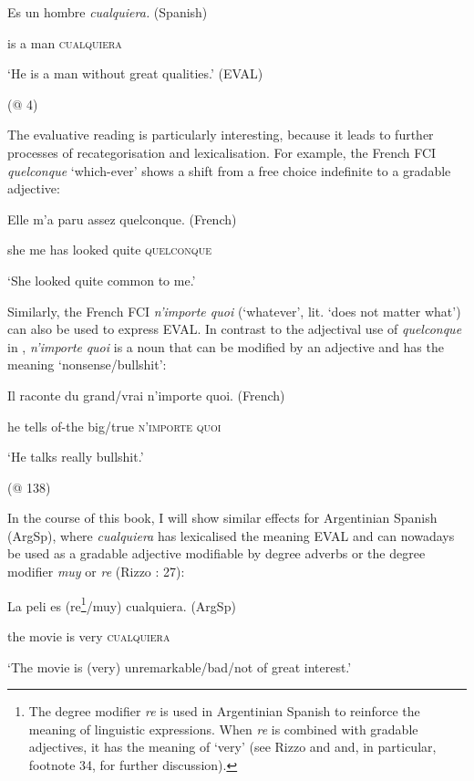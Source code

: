     Es  un  hombre  \textit{cualquiera.}    (Spanish)

    is  a  man  \textsc{cualquiera}    

    ‘He is a man without great qualities.’ (EVAL)

    (@ 4)

The evaluative reading is particularly interesting, because it leads to further processes of recategorisation and lexicalisation. For example, the French FCI \textit{quelconque} ‘which-ever’ shows a shift from a free choice indefinite to a gradable adjective:

    Elle  m’a  paru  assez  quelconque.  (French)

    she  me has  looked  quite  \textsc{quelconque}   

    ‘She looked quite common to me.’   

    \citep[1530]{Vlachou2012}

Similarly, the French FCI \textit{n’importe quoi} (‘whatever’, lit. ‘does not matter what’) can also be used to express EVAL. In contrast to the adjectival use of \textit{quelconque} in , \textit{n’importe} \textit{quoi} is a noun that can be modified by an adjective and has the meaning ‘nonsense/bullshit’:

    Il  raconte  du  grand/vrai  n’importe quoi.  (French)

    he  tells  of-the  big/true  \textsc{n’importe} \textsc{quoi}   

    ‘He talks really bullshit.’  

    (@ 138)

In the course of this book, I will show similar effects for Argentinian Spanish (ArgSp), where \textit{cualquiera} has lexicalised the meaning EVAL and can nowadays be used as a gradable adjective modifiable by degree adverbs or the degree modifier \textit{muy} or \textit{re} (Rizzo \citealt{Salierno2013}: 27):

    La  peli  es  (re\footnote{{The degree modifier} {\textit{re}} {is used in Argentinian Spanish to reinforce the meaning of linguistic expressions. When} {\textit{re}} {is combined with gradable adjectives, it has the meaning of ‘very’ (see Rizzo \citealt{Salierno2013} and  and, in particular, footnote 34, for further discussion).}}/muy)  cualquiera.  (ArgSp)

    the  movie  is  very  \textsc{cualquiera}   

    ‘The movie is (very) unremarkable/bad/not of great interest.’

